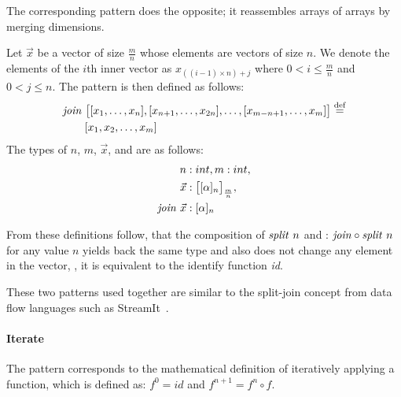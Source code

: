 \noindent
The corresponding \join pattern does the opposite; it reassembles arrays of arrays by merging dimensions.
\begin{definition}
  \label{definition:pattern:join}
  Let $\vec{x}$ be a vector of size $\frac{m}{n}$ whose elements are vectors of size $n$.
  We denote the elements of the $i$th inner vector as $x_{((i-1)\times n) + j}$ where $0 < i \leq \frac{m}{n}$ and $0 < j \leq n$.
  The \join pattern is then defined as follows:
  \begin{align*}
    &\text{\textit{join}}\ \big[[x_1, \ldots, x_n], [x_{n+1}, \ldots, x_{2n}], \ldots, [x_{m-n+1}, \ldots, x_m]\big] \stackrel{\textrm{\scriptsize def}}{=}\\
    &\qquad[x_1, x_2, \dots, x_m]
  \end{align*}
  The types of $n$, $m$, $\vec{x}$, and \join are as follows:
  \begin{align*}
    n &: int, m : int,\\
    \vec{x} &: \big[[\alpha]_n\big]_{\frac{m}{n}},\\
    \text{\textit{join}}\ \vec{x} &: [\alpha]_n
  \end{align*}
\end{definition}

\noindent
From these definitions follow, that the composition of $\text{\textit{split}}\ n$ and \join: $\text{\textit{join}} \circ \text{\textit{split}}\ n$ for any value $n$ yields back the same type and also does not change any element in the vector, \ie, it is equivalent to the identify function \emph{id}.

These two patterns used together are similar to the split-join concept from data flow languages such as StreamIt~\cite{ThiesKaAm2002}.


\paragraph{Iterate}
The \iterateN pattern corresponds to the mathematical definition of iteratively applying a function, which is defined as: {$f^0 = id$} and {$f^{n+1} = f^n \circ f$}.

